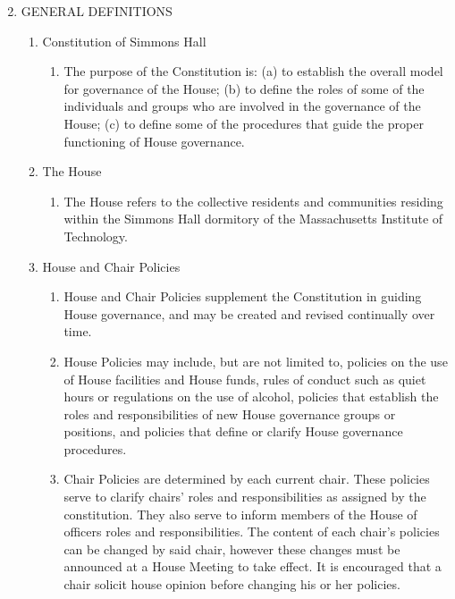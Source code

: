 \documentclass[letterpaper]{article}
\begin{document}
\begin{enumerate}
\setcounter{enumi}{1} %
\item GENERAL DEFINITIONS

\begin{enumerate}

\item Constitution of Simmons Hall

\begin{enumerate}

\item The purpose of the Constitution is: (a) to establish the overall model for governance of the House; (b) to define the roles of some of the individuals and groups who are involved in the governance of the House; (c) to define some of the procedures that guide the proper functioning of House governance.

\end{enumerate}

\item The House

\begin{enumerate}

\item The House refers to the collective residents and communities residing within the Simmons Hall dormitory of the Massachusetts Institute of Technology.

\end{enumerate}

\item House and Chair Policies

\begin{enumerate}

\item House and Chair Policies supplement the Constitution in guiding House governance, and may be created and revised continually over time.

\item House Policies may include, but are not limited to, policies on the use of House facilities and House funds, rules of conduct such as quiet hours or regulations on the use of alcohol, policies that establish the roles and responsibilities of new House governance groups or positions, and policies that define or clarify House governance procedures.

\item Chair Policies are determined by each current chair. These policies serve to clarify chairs' roles and responsibilities as assigned by the constitution. They also serve to inform members of the House of officers roles and responsibilities. The content of each chair's policies can be changed by said chair, however these changes must be announced at a House Meeting to take effect. It is encouraged that a chair solicit house opinion before changing his or her policies.


\end{enumerate}
\end{enumerate}
\end{enumerate}
\end{document}
